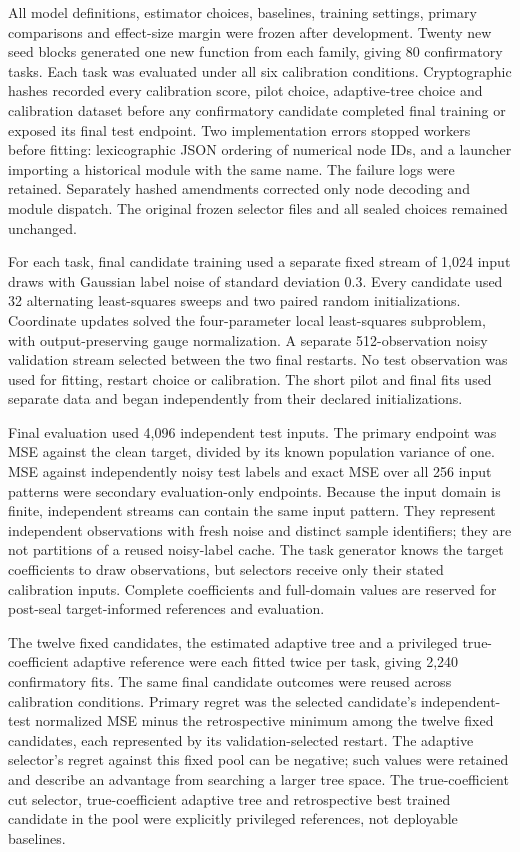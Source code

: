 All model definitions, estimator choices, baselines, training settings, primary comparisons and effect-size margin were frozen after development. Twenty new seed blocks generated one new function from each family, giving 80 confirmatory tasks. Each task was evaluated under all six calibration conditions. Cryptographic hashes recorded every calibration score, pilot choice, adaptive-tree choice and calibration dataset before any confirmatory candidate completed final training or exposed its final test endpoint. Two implementation errors stopped workers before fitting: lexicographic JSON ordering of numerical node IDs, and a launcher importing a historical module with the same name. The failure logs were retained. Separately hashed amendments corrected only node decoding and module dispatch. The original frozen selector files and all sealed choices remained unchanged.

For each task, final candidate training used a separate fixed stream of 1,024 input draws with Gaussian label noise of standard deviation 0.3. Every candidate used 32 alternating least-squares sweeps and two paired random initializations. Coordinate updates solved the four-parameter local least-squares subproblem, with output-preserving gauge normalization. A separate 512-observation noisy validation stream selected between the two final restarts. No test observation was used for fitting, restart choice or calibration. The short pilot and final fits used separate data and began independently from their declared initializations.

Final evaluation used 4,096 independent test inputs. The primary endpoint was MSE against the clean target, divided by its known population variance of one. MSE against independently noisy test labels and exact MSE over all 256 input patterns were secondary evaluation-only endpoints. Because the input domain is finite, independent streams can contain the same input pattern. They represent independent observations with fresh noise and distinct sample identifiers; they are not partitions of a reused noisy-label cache. The task generator knows the target coefficients to draw observations, but selectors receive only their stated calibration inputs. Complete coefficients and full-domain values are reserved for post-seal target-informed references and evaluation.

The twelve fixed candidates, the estimated adaptive tree and a privileged true-coefficient adaptive reference were each fitted twice per task, giving 2,240 confirmatory fits. The same final candidate outcomes were reused across calibration conditions. Primary regret was the selected candidate's independent-test normalized MSE minus the retrospective minimum among the twelve fixed candidates, each represented by its validation-selected restart. The adaptive selector's regret against this fixed pool can be negative; such values were retained and describe an advantage from searching a larger tree space. The true-coefficient cut selector, true-coefficient adaptive tree and retrospective best trained candidate in the pool were explicitly privileged references, not deployable baselines.

